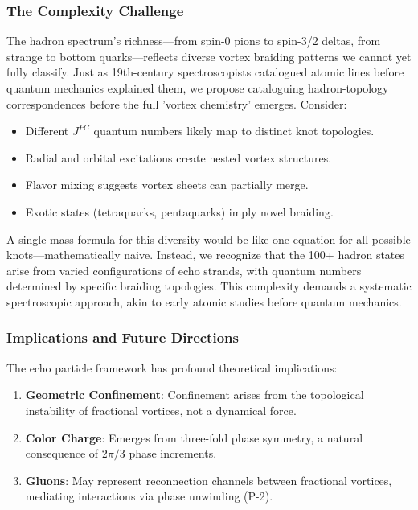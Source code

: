 \subsubsection{The Complexity Challenge}

The hadron spectrum's richness---from spin-0 pions to spin-3/2 deltas, from strange to bottom quarks---reflects diverse vortex braiding patterns we cannot yet fully classify. Just as 19th-century spectroscopists catalogued atomic lines before quantum mechanics explained them, we propose cataloguing hadron-topology correspondences before the full 'vortex chemistry' emerges. Consider:

\begin{itemize}
\item Different $J^{PC}$ quantum numbers likely map to distinct knot topologies.
\item Radial and orbital excitations create nested vortex structures.
\item Flavor mixing suggests vortex sheets can partially merge.
\item Exotic states (tetraquarks, pentaquarks) imply novel braiding.
\end{itemize}

A single mass formula for this diversity would be like one equation for all possible knots---mathematically naive. Instead, we recognize that the 100+ hadron states arise from varied configurations of echo strands, with quantum numbers determined by specific braiding topologies. This complexity demands a systematic spectroscopic approach, akin to early atomic studies before quantum mechanics.

\subsubsection{Implications and Future Directions}

The echo particle framework has profound theoretical implications:

\begin{enumerate}
\item \textbf{Geometric Confinement}: Confinement arises from the topological instability of fractional vortices, not a dynamical force.
\item \textbf{Color Charge}: Emerges from three-fold phase symmetry, a natural consequence of $2\pi/3$ phase increments.
\item \textbf{Gluons}: May represent reconnection channels between fractional vortices, mediating interactions via phase unwinding (P-2).
\end{enumerate}

